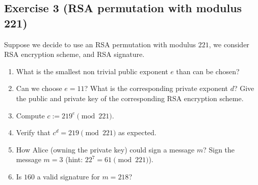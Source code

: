 \subsection{Exercise 3 (RSA permutation with modulus 221)}
Suppose we decide to use an RSA permutation with modulus $221$, we consider RSA encryption scheme, and RSA signature.
\begin{enumerate}
	\item What is the smallest non trivial public exponent $e$ than can be
	chosen?
	\item Can we choose $e=11$? What is the corresponding private exponent $d$? Give the public and private key of the corresponding RSA encryption scheme.
	\item Compute $c := 219^e \pmod{221}$.
	\item Verify that $c^d = 219 \pmod{221}$ as expected.
	\item How Alice (owning the private key) could sign a message $m$? Sign the message $m=3$ (hint: $22^7= 61 \pmod{221}$).
	\item Is $160$ a valid signature for $m=218$?
\end{enumerate}
